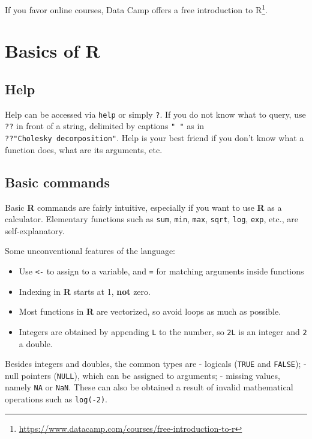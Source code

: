 \documentclass[]{book}
\providecommand{\tightlist}{%
  \setlength{\itemsep}{0pt}\setlength{\parskip}{0pt}}
\let\rmarkdownfootnote\footnote%
\def\footnote{\protect\rmarkdownfootnote}
\renewcommand{\href}[2]{#2\footnote{\url{#1}}}
\theoremstyle{definition}
\theoremstyle{definition}
\theoremstyle{definition}
\theoremstyle{remark}
\begin{document}
If you favor online courses, Data Camp offers a
\href{https://www.datacamp.com/courses/free-introduction-to-r}{free
introduction to R}.

\section{\texorpdfstring{Basics of
\textbf{R}}{Basics of R}}\label{basics-of-r}

\subsection{Help}\label{help}

Help can be accessed via \texttt{help} or simply \texttt{?}. If you do
not know what to query, use \texttt{??} in front of a string, delimited
by captions \texttt{"\ "} as in \texttt{??"Cholesky\ decomposition"}.
Help is your best friend if you don't know what a function does, what
are its arguments, etc.

\subsection{Basic commands}\label{basic-commands}

Basic \textbf{R} commands are fairly intuitive, especially if you want
to use \textbf{R} as a calculator. Elementary functions such as
\texttt{sum}, \texttt{min}, \texttt{max}, \texttt{sqrt}, \texttt{log},
\texttt{exp}, etc., are self-explanatory.

Some unconventional features of the language:

\begin{itemize}
\tightlist
\item
  Use \texttt{\textless{}-} to assign to a variable, and \texttt{=} for
  matching arguments inside functions
\item
  Indexing in \textbf{R} starts at 1, \textbf{not} zero.
\item
  Most functions in \textbf{R} are vectorized, so avoid loops as much as
  possible.
\item
  Integers are obtained by appending \texttt{L} to the number, so
  \texttt{2L} is an integer and \texttt{2} a double.
\end{itemize}

Besides integers and doubles, the common types are - logicals
(\texttt{TRUE} and \texttt{FALSE}); - null pointers (\texttt{NULL}),
which can be assigned to arguments; - missing values, namely \texttt{NA}
or \texttt{NaN}. These can also be obtained a result of invalid
mathematical operations such as \texttt{log(-2)}.
\end{document}
